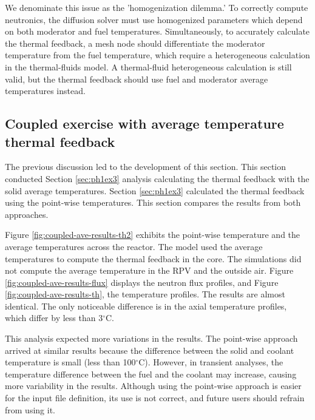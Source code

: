 We denominate this issue as the 'homogenization dilemma.'
To correctly compute neutronics, the diffusion solver must use homogenized parameters which depend on both moderator and fuel temperatures.
Simultaneously, to accurately calculate the thermal feedback, a mesh node should differentiate the moderator temperature from the fuel temperature, which require a heterogeneous calculation in the thermal-fluids model.
A thermal-fluid heterogeneous calculation is still valid, but the thermal feedback should use fuel and moderator average temperatures instead.

\subsection{Coupled exercise with average temperature thermal feedback}
\label{sec:coupled-average}

The previous discussion led to the development of this section.
This section conducted Section \ref{sec:ph1ex3} analysis calculating the thermal feedback with the solid average temperatures.
Section \ref{sec:ph1ex3} calculated the thermal feedback using the point-wise temperatures.
This section compares the results from both approaches.

Figure \ref{fig:coupled-ave-results-th2} exhibits the point-wise temperature and the average temperatures across the reactor.
The model used the average temperatures to compute the thermal feedback in the core.
The simulations did not compute the average temperature in the RPV and the outside air.
Figure \ref{fig:coupled-ave-results-flux} displays the neutron flux profiles, and Figure \ref{fig:coupled-ave-results-th}, the temperature profiles.
The results are almost identical.
The only noticeable difference is in the axial temperature profiles, which differ by less than 3$^{\circ}$C.

This analysis expected more variations in the results.
The point-wise approach arrived at similar results because the difference between the solid and coolant temperature is small (less than 100$^{\circ}$C).
However, in transient analyses, the temperature difference between the fuel and the coolant may increase, causing more variability in the results.
Although using the point-wise approach is easier for the input file definition, its use is not correct, and future users should refrain from using it.

